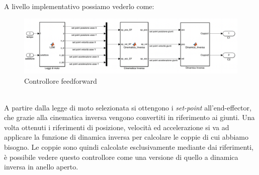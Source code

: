 A livello implementativo possiamo vederlo come:
\begin{figure}[ht]
	\begin{center}
		\includegraphics[scale=0.37]{Immagini/Controllori/feedForward}
		\caption{Controllore feedforward}
		\label{fig:FF}
	\end{center}
\end{figure}
\\A partire dalla legge di moto selezionata si ottengono i \textit{set-point} all'end-effector, che grazie alla cinematica inversa vengono convertiti in riferimento ai giunti.  Una volta ottenuti i riferimenti di posizione, velocità ed accelerazione si va ad applicare la funzione di dinamica inversa per calcolare le coppie di cui abbiamo bisogno. Le coppie sono quindi calcolate esclusivamente mediante dai riferimenti, è possibile vedere questo controllore come una versione di quello a dinamica inversa in anello aperto.
